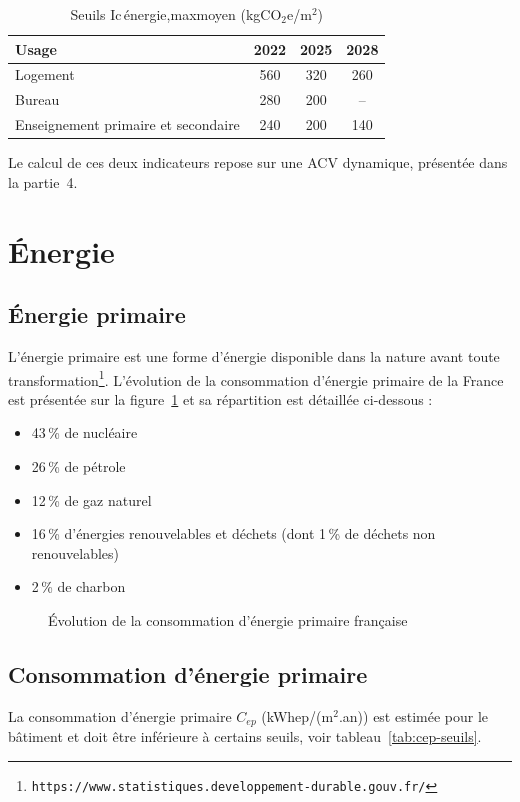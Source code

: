 \begin{table}[h]
\centering
\caption{Seuils Ic\,énergie,maxmoyen (kgCO$_2$e/m$^2$)}
\label{tab:ic-energie}
\begin{tabular}{lccc}
\hline
Usage & 2022 & 2025 & 2028 \\
\hline
Logement & 560 & 320 & 260 \\
Bureau & 280 & 200 & -- \\
Enseignement primaire et secondaire & 240 & 200 & 140 \\
\hline
\end{tabular}
\end{table}

Le calcul de ces deux indicateurs repose sur une ACV dynamique, présentée dans la partie~4.

\section{Énergie}

\subsection*{Énergie primaire} L'énergie primaire est une forme d'énergie disponible dans la nature avant toute transformation\footnote{\texttt{https://www.statistiques.developpement-durable.gouv.fr/}}. L'évolution de la consommation d’énergie primaire de la France est présentée sur la figure~\ref{fig:primaire} et sa répartition est détaillée ci-dessous :
\begin{itemize}
  \item 43\,\% de nucléaire
  \item 26\,\% de pétrole
  \item 12\,\% de gaz naturel
  \item 16\,\% d'énergies renouvelables et déchets (dont 1\,\% de déchets non renouvelables)
  \item 2\,\% de charbon
\end{itemize}


\begin{figure}
    \centering
    
    \caption{Évolution de la consommation d’énergie primaire française}
    \label{fig:primaire}
\end{figure}

\subsection*{Consommation d'énergie primaire}
La consommation d'énergie primaire $C_{ep}$ (kWhep/(m$^2$.an)) est estimée pour le bâtiment et doit être inférieure à certains seuils, voir tableau~\ref{tab:cep-seuils}.

